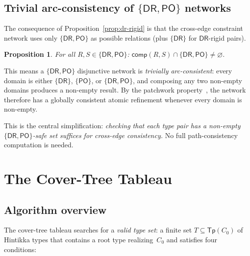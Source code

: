 \documentclass[
]{ceurart}
\newtheorem{proposition}[theorem]{Proposition}
\theoremstyle{definition}
\newcommand{\DR}{\ensuremath{\mathsf{DR}}}
\newcommand{\PO}{\ensuremath{\mathsf{PO}}}
\newcommand{\comp}{\ensuremath{\mathsf{comp}}}
\newcommand{\Tp}{\ensuremath{\mathsf{Tp}}}
\begin{document}
\subsection{Trivial arc-consistency of $\{\DR,\PO\}$ networks}

The consequence of Proposition~\ref{prop:dr-rigid} is that the
cross-edge constraint network uses only $\{\DR, \PO\}$ as possible
relations (plus $\{\DR\}$ for $\DR$-rigid pairs).

\begin{proposition}
\label{prop:drpo-arc}
For all $R, S \in \{\DR, \PO\}$:
$\comp(R, S) \cap \{\DR, \PO\} \neq \varnothing$.
\end{proposition}

This means a $\{\DR,\PO\}$ disjunctive network is
\emph{trivially arc-consistent}: every domain is either
$\{\DR\}$, $\{\PO\}$, or $\{\DR,\PO\}$, and composing any two
non-empty domains produces a non-empty result.
By the patchwork property~\cite{RenzNebel1999}, the network
therefore has a globally consistent atomic refinement whenever
every domain is non-empty.

This is the central simplification: \emph{checking that each type
pair has a non-empty $\{\DR,\PO\}$-safe set suffices for
cross-edge consistency.}  No full path-consistency computation is
needed.

\section{The Cover-Tree Tableau}
\label{sec:cover-tree}

\subsection{Algorithm overview}

The cover-tree tableau searches for a \emph{valid type set}:
a finite set $T \subseteq \Tp(C_0)$ of Hintikka types that
contains a root type realizing~$C_0$ and satisfies four conditions:
\end{document}
